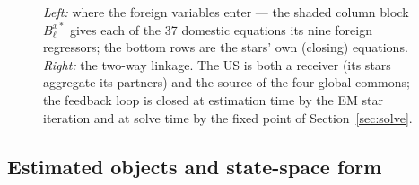 \documentclass[11pt]{article}
\newcommand{\code}[1]{\texttt{\small #1}}
\begin{document}
\begin{figure}[t]
{}
\caption{\emph{Left:} where the foreign variables enter --- the shaded column block $B^{x*}_\ell$
gives each of the 37 domestic equations its nine foreign regressors; the bottom rows are the
stars' own (closing) equations. \emph{Right:} the two-way linkage. The US is both a receiver
(its stars aggregate its partners) and the source of the four global commons; the feedback loop is
closed at estimation time by the EM star iteration and at solve time by the fixed point of
Section~\ref{sec:solve}.}
\label{fig:partition}
\end{figure}

\subsection{Estimated objects and state-space form}\label{sec:ss}
\end{document}

